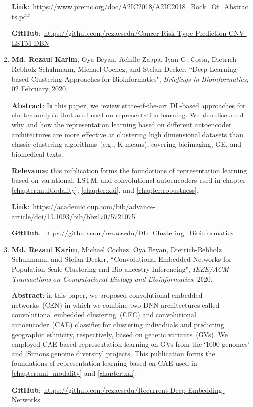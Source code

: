 \begin{enumerate}
	\textbf{Link}:~\url{https://www.premc.org/doc/A2IC2018/A2IC2018_Book_Of_Abstracts.pdf}
	
	\textbf{GitHub}:~\url{https://github.com/rezacsedu/Cancer-Risk-Type-Prediction-CNV-LSTM-DBN}
	
	\item \textbf{Md. Rezaul Karim}, Oya Beyan, Achille Zappa, Ivan G. Costa, Dietrich Rebholz-Schuhmann, Michael Cochez, and Stefan Decker, ``Deep Learning-based Clustering Approaches for Bioinformatics", \emph{Briefings in Bioinformatics}, 02 February, 2020.
	
	\textbf{Abstract}: In this paper, we review state-of-the-art DL-based approaches for cluster analysis that are based on representation learning. We also discussed why and how the representation learning based on different autoencoder architectures are more effective at clustering high dimensional datasets than classic clustering algorithms~(e.g., K-means), covering bioimaging, GE, and biomedical texts. 
	
	\textbf{Relevance}: this publication forms the foundations of representation learning based on variational, LSTM, and convolutional autoencoders used in chapter \ref{chapter:multiodality}, \ref{chapter:xai}, and \ref{chapter:robustness}.

	\textbf{Link}:~\url{https://academic.oup.com/bib/advance-article/doi/10.1093/bib/bbz170/5721075}
	
	\textbf{GitHub}:~\url{https://github.com/rezacsedu/DL_Clustering_Bioinformatics}
	
	\item \textbf{Md. Rezaul Karim}, Michael Cochez, Oya Beyan, Dietrich-Rebholz Schuhmann, and Stefan Decker, ``Convolutional Embedded Networks for Population Scale Clustering and Bio-ancestry Inferencing", \emph{IEEE/ACM Transactions on Computational Biology and Bioinformatics}, 2020.
	
	\textbf{Abstract}: in this paper, we proposed convolutional embedded networks~(CEN) in which we combine two DNN architectures called convolutional embedded clustering~(CEC) and convolutional autoencoder~(CAE) classifier for clustering individuals and predicting geographic ethnicity, respectively, based on genetic variants~(GVs). We employed CAE-based representation learning on GVs from the `1000 genomes' and `Simons genome diversity' projects. This publication forms the foundations of representation learning based on CAE used in \cref{chapter:uni_modality} and \cref{chapter:xai}.

	\textbf{GitHub}:~\url{https://github.com/rezacsedu/Recurrent-Deep-Embedding-Networks}
	

\end{enumerate}
